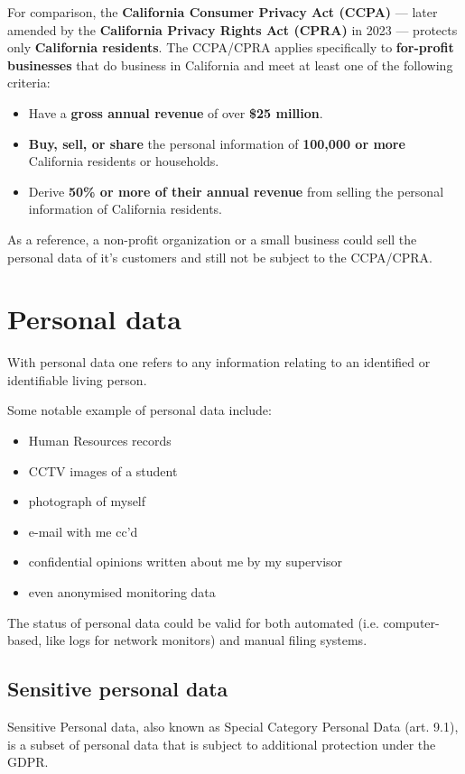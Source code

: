 For comparison, the \textbf{California Consumer Privacy Act (CCPA)} —
later amended by the \textbf{California Privacy Rights Act (CPRA)} in
2023 — protects only \textbf{California residents}. The CCPA/CPRA
applies specifically to \textbf{for-profit businesses} that do
business in California and meet at least one of the following
criteria:
\begin{itemize}
    \item Have a \textbf{gross annual revenue} of over \textbf{\$25
      million}.
    \item \textbf{Buy, sell, or share} the personal information of
      \textbf{100,000 or more} California residents or households.
    \item Derive \textbf{50\% or more of their annual revenue} from
      selling the personal information of California residents.
\end{itemize}
As a reference, a non-profit organization or a small business could
sell the personal data of it's customers and still not be subject to 
the CCPA/CPRA.

\section{Personal data}
\begin{boxH}
  With personal data one refers to any information relating to an
  identified or identifiable living person.
\end{boxH}
Some notable example of personal data include:
\begin{itemize}
  \item Human Resources records
  \item CCTV images of a student
  \item photograph of myself
  \item e-mail with me cc’d
  \item confidential opinions written about me by my supervisor
  \item even anonymised monitoring data
\end{itemize}
The status of personal data could be valid for both automated (i.e.
computer-based, like logs for network monitors) and manual filing
systems.

\subsection{Sensitive personal data}
Sensitive Personal data, also known as Special Category Personal Data
(art. 9.1), is a subset of personal data that is subject to additional 
protection under the GDPR.

